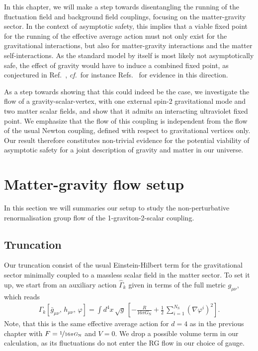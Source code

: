 \documentclass[11pt]{book}
\newcommand\gmunu{ g_{\mu\nu} }
\newcommand\bgmunu{ \bar g_{\mu\nu} }
\newcommand\hmunu{ h_{\mu\nu} }
\newcommand\NS{ N_{\scriptscriptstyle{\mathrm{S}}} }
\newcommand\GNewton{ G_{\scriptscriptstyle{\mathrm{N}}}{} }
\newcommand\cf{\textit{cf.}\ }
\numberwithin{equation}{chapter}
\begin{document}
In this chapter, we will make a step towards disentangling the running of the fluctuation field and
background field couplings, focusing on the matter-gravity sector.
In the context of asymptotic safety, this implies that a viable fixed point
for the running of the effective average action must not only exist
for the gravitational interactions, but also for matter-gravity interactions and the
matter self-interactions.
As the standard model by itself is most likely not asymptotically safe,
the effect of gravity would have to induce a combined fixed point,
as conjectured in Ref.~\cite{Shaposhnikov:2009pv},
\cf for instance Refs.~\cite{Zanusso:2009bs, Vacca:2010mj,
Harst:2011zx, Eichhorn:2011pc, Eichhorn:2012va,Oda:2015sma
} for evidence in this direction.

As a step towards showing that this could indeed be the case,
we investigate the flow of a gravity-scalar-vertex,
with one external spin-2 gravitational mode and two matter
scalar fields,
and show that it admits an interacting ultraviolet fixed point.
We emphasize that the flow of this coupling is independent from the flow of the usual Newton coupling,
defined with respect to gravitational vertices only.
Our result therefore constitutes non-trivial evidence for the potential viability of asymptotic safety
for a joint description of gravity and matter in our universe.


\section{Matter-gravity flow setup}

In this section we will summaries our setup to study the
non-perturbative renormalisation group flow of the
1-graviton-2-scalar coupling.

\subsection{Truncation}

Our truncation consist of the usual Einstein-Hilbert term for the gravitational sector minimally coupled
to a massless scalar field in the matter sector.
To set it up, we start from an auxiliary action $\hat{\Gamma}_k$ given in terms of the full
metric $\gmunu$, which reads
\begin{align}
  \hat \Gamma_k[\bgmunu, \, \hmunu, \, \varphi] = \int d^4x \, \sqrt{g} \,
  \left[
    - \frac{R}{16 \pi \GNewton} + \frac{1}{2} \, \sum_{i=1}^{\NS} \left( \nabla\varphi^i \right)^2
  \right] .
\end{align}
Note, that this is the same effective average action for $d=4$ as in the previous chapter with
$F=\nicefrac{1}{16\pi\GNewton}$ and $V=0$.
We drop a possible volume term in our calculation,
as its fluctuations do not enter the RG flow in our choice of gauge.
\end{document}
